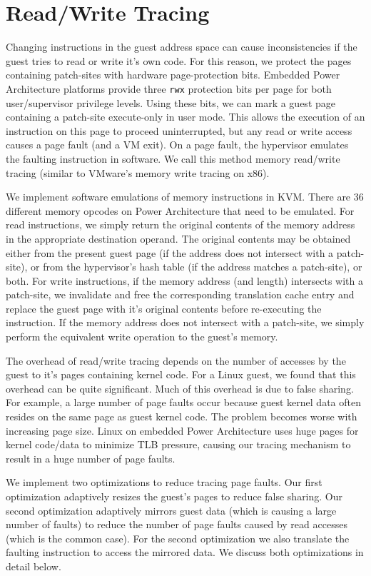 \documentclass[10pt,twocolumn]{article}
\begin{document}
\section{Read/Write Tracing}
\label{sec:tracing}
Changing instructions in the guest address space can cause
inconsistencies if the guest tries to read or write it's own code.
For this reason, we protect the pages containing patch-sites with hardware
page-protection bits. Embedded Power Architecture platforms provide three {\tt rwx}
protection bits per page for both user/supervisor privilege levels. Using these
bits, we can mark a guest page containing a patch-site
execute-only in user mode. This allows the
execution of an instruction on this page to proceed uninterrupted,
but any read or write access causes a page fault (and a VM exit).
On a page fault, the hypervisor
emulates the faulting instruction in software. We call this
method memory read/write tracing (similar to VMware's memory write tracing
on x86\cite{adams:asplos06}).

We implement software emulations of memory instructions in KVM. There are 36
different memory opcodes on Power Architecture that need to be emulated.
For read instructions, we simply return the original contents of the memory
address in the appropriate destination
operand. The original contents may be obtained either from the present guest
page (if the address does not intersect with a patch-site), or from the hypervisor's
hash table (if the address matches a patch-site), or both.
For write instructions, if the memory address (and length) intersects with a patch-site,
we invalidate and free the corresponding translation cache
entry and replace the guest page with it's original contents before
re-executing the instruction. If the memory address does not intersect with a
patch-site, we simply perform the equivalent write operation to the guest's memory.

The overhead of read/write tracing depends on the number of accesses by the guest
to it's pages containing kernel code. For a Linux guest, we found that this overhead
can be quite significant.
Much of this overhead is due to false sharing. For example, a large number of page
faults occur because guest kernel data often resides on the same page as
guest kernel code. The problem becomes worse with increasing page size. Linux
on embedded
Power Architecture uses huge pages for kernel code/data to minimize
TLB pressure, causing our tracing mechanism to result in a huge number of page
faults.

We implement two optimizations to reduce tracing page faults. Our first optimization
adaptively resizes the guest's pages to reduce false sharing.
Our second optimization adaptively
mirrors guest data (which is causing a large number of faults) to reduce the number
of page faults caused by read accesses (which is the common case). For the second
optimization we also translate the faulting instruction to access the mirrored data.
We discuss both optimizations in detail below.
\end{document}
